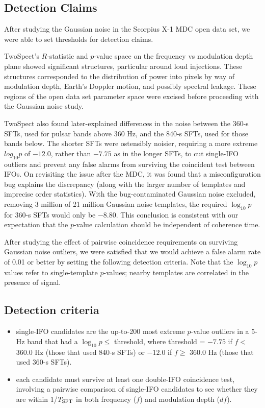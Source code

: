 \subsection{Detection Claims}

After studying the Gaussian noise in the Scorpius X-1 MDC open data set, we were able to set thresholds for detection claims.

TwoSpect's $R$-statistic and $p$-value space on the {frequency} vs {modulation depth} plane showed significant structures, particular around loud injections. These structures corresponded to the distribution of power into pixels by way of modulation depth, Earth's Doppler motion, and possibly spectral leakage. These regions of the open data set parameter space were excised before proceeding with the Gaussian noise study.

TwoSpect also found later-explained differences in the noise between the 360-s SFTs, used for pulsar bands above 360 Hz, and the 840-s SFTs, used for those bands below. 
The shorter SFTs were ostensibly noisier, requiring a more extreme $log_{10}p$ of $-12.0$, rather than $-7.75$ as in the longer SFTs, to cut single-IFO outliers and prevent any false alarms from surviving the coincident test between IFOs.
On revisiting the issue after the MDC, it was found that a misconfiguration bug explains the discrepancy (along with the larger number of templates and imprecise order statistics).
With the bug-contaminated Gaussian noise excluded, removing 3 million of 21 million Gaussian noise templates, the required $\log_{10}p$ for 360-s SFTs would only be $-8.80$.
This conclusion is consistent with our expectation that the $p$-value calculation should be independent of coherence time.

After studying the effect of pairwise coincidence requirements on surviving Gaussian noise outliers, we were satisfied that we would achieve a false alarm rate of 0.01 or better by setting the following detection criteria. 
Note that the $\log_{10} p$ values refer to single-template $p$-values; nearby templates are correlated in the presence of signal.

\subsection{Detection criteria}

\begin{itemize}
\item single-IFO candidates are the up-to-200 most extreme $p$-value outliers in a 5-Hz band that had a $\log_{10}p \leq$ threshold, where threshold = $-7.75$ if $f <$ 360.0 Hz (those that used 840-s SFTs) or $-12.0$ if $f \geq$ 360.0 Hz (those that used 360-s SFTs).
\item each candidate must survive at least one double-IFO coincidence test, involving a pairwise comparison of single-IFO candidates to see whether they are within 1/$T_{\textup{SFT}}$ in both frequency ($f$) and modulation depth ($df$).
\end{itemize}

